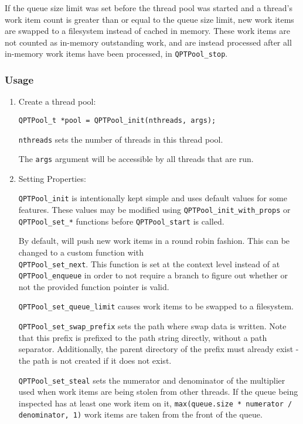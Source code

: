 If the queue size limit was set before the thread pool was started and
a thread's work item count is greater than or equal to the queue size
limit, new work items are swapped to a filesystem instead of cached in
memory. These work items are not counted as in-memory outstanding
work, and are instead processed after all in-memory work items have
been processed, in \texttt{QPTPool\_stop}.

\subsubsection{Usage}
\begin{enumerate}
\item Create a thread pool:

  \texttt{QPTPool\_t *pool = QPTPool\_init(nthreads, args);}

  \texttt{nthreads} sets the number of threads in this thread
  pool.

  The \texttt{args} argument will be accessible by all threads that
  are run.

\item Setting Properties:

  \texttt{QPTPool\_init} is intentionally kept simple and uses default
  values for some features. These values may be modified using
  \texttt{QPTPool\_init\_with\_props} or \texttt{QPTPool\_set\_*}
  functions before \texttt{QPTPool\_start} is called.

  By default, \qptp will push new work items in a round robin
  fashion. This can be changed to a custom function with
  \\\texttt{QPTPool\_set\_next}. This function is set at the context
  level instead of at \texttt{QPTPool\_enqueue} in order to not
  require a branch to figure out whether or not the provided function
  pointer is valid.

  \texttt{QPTPool\_set\_queue\_limit} causes work items to be swapped
  to a filesystem.

  \texttt{QPTPool\_set\_swap\_prefix} sets the path where swap data is
  written. Note that this prefix is prefixed to the path string
  directly, without a path separator. Additionally, the parent
  directory of the prefix must already exist - the path is not created
  if it does not exist.

  \texttt{QPTPool\_set\_steal} sets the numerator and denominator of
  the multiplier used when work items are being stolen from other
  threads. If the queue being inspected has at least one work item on
  it, \texttt{max(queue.size * numerator / denominator, 1)} work items
  are taken from the front of the queue.


\end{enumerate}
